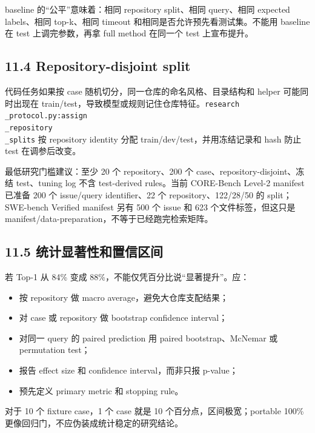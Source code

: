 \documentclass[UTF8,12pt,openany]{ctexbook}
\begin{document}
baseline 的“公平”意味着：相同 repository split、相同 query、相同 expected labels、相同 top-k、相同 timeout 和相同是否允许预先看测试集。不能用 baseline 在 test 上调完参数，再拿 full method 在同一个 test 上宣布提升。\par

\subsection{11.4 Repository-disjoint split}

代码任务如果按 case 随机切分，同一仓库的命名风格、目录结构和 helper 可能同时出现在 train/test，导致模型或规则记住仓库特征。\texttt{research\\_protocol.py:assign\\_repository\\_splits} 按 repository identity 分配 train/dev/test，并用冻结记录和 hash 防止 test 在调参后改变。\par

最低研究门槛建议：至少 20 个 repository、200 个 case、repository-disjoint、冻结 test、tuning log 不含 test-derived rules。当前 CORE-Bench Level-2 manifest 已准备 200 个 issue/query identifier、22 个 repository、122/28/50 的 split；SWE-bench Verified manifest 另有 500 个 issue 和 623 个文件标签，但这只是 manifest/data-preparation，不等于已经跑完检索矩阵。\par

\subsection{11.5 统计显著性和置信区间}

若 Top-1 从 84\% 变成 88\%，不能仅凭百分比说“显著提升”。应：\par

\begin{itemize}
\item 按 repository 做 macro average，避免大仓库支配结果；
\item 对 case 或 repository 做 bootstrap confidence interval；
\item 对同一 query 的 paired prediction 用 paired bootstrap、McNemar 或 permutation test；
\item 报告 effect size 和 confidence interval，而非只报 p-value；
\item 预先定义 primary metric 和 stopping rule。
\end{itemize}

对于 10 个 fixture case，1 个 case 就是 10 个百分点，区间极宽；portable 100\% 更像回归门，不应伪装成统计稳定的研究结论。\par
\end{document}
